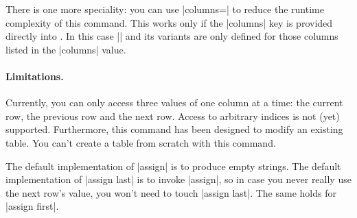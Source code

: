 \begin{command}{\pgfplotstablecreatecol{}}
\begin{codeexample}[]
\pgfplotstabletypeset[
	column type=l,
	columns={level,new},
	columns/new/.style={string type}
]\table
\end{codeexample}

There is one more speciality: you can use |columns=| to reduce the runtime complexity of this command. This works only if the |columns| key is provided directly into . In this case |\thisrow| and its variants are only defined for those columns listed in the |columns| value.

\paragraph{Limitations.} Currently, you can only access three values of one column at a time: the current row, the previous row and the next row. Access to arbitrary indices is not (yet) supported. Furthermore, this command has been designed to modify an existing table. You can't create a table from scratch with this command.

The default implementation of |assign| is to produce empty strings. The default implementation of |assign last| is to invoke |assign|, so in case you never really use the next row's value, you won't need to touch |assign last|. The same holds for |assign first|.
\end{command}

